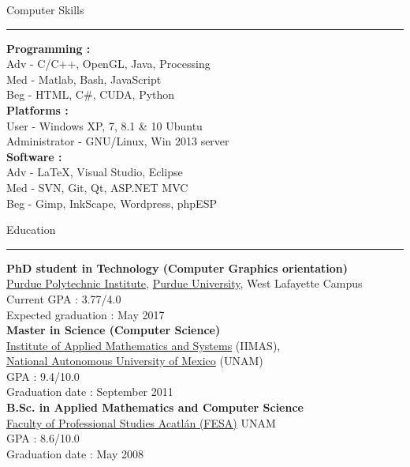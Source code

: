 \documentclass[letterpaper,10pt]{article}
\begin{document}
\begin{minipage}{0.40\textwidth}
\vspace*{-0.5cm}
 {\large{Computer Skills}} \\
 \textcolor{Dandelion}{\rule{0.5\textwidth}{0.05in}} 

\textbf{Programming :} \\
Adv - C/C++, OpenGL, Java, Processing \\
Med - Matlab, Bash, JavaScript \\
Beg - HTML, C\#, CUDA, Python\\

\textbf{Platforms :} \\
User - Windows XP, 7, 8.1 \& 10 Ubuntu \\
Administrator - GNU/Linux, Win 2013 server\\

\textbf{Software :} \\
Adv - \LaTeX, Visual Studio, Eclipse \\
Med - SVN, Git, Qt, ASP.NET MVC \\
Beg - Gimp, InkScape,  Wordpress, phpESP\\
\end{minipage}
%
\hspace{0.025\textwidth}
%
\begin{minipage}{0.70\textwidth} 
\vspace*{1.0cm}
{\centering \large{{Education}}} \\
\textcolor{Dandelion}{\rule{0.4\textwidth}{0.05in}}

\textbf{PhD student in Technology (Computer Graphics orientation)} \\
\href{http://polytechnic.purdue.edu/}{Purdue Polytechnic Institute}, \href{http://www.purdue.edu/}{Purdue University}, West Lafayette Campus \\
Current GPA : 3.77/4.0 \\
Expected graduation : May 2017 \\

\textbf{Master in Science (Computer Science)} \\
\href{http://www.iimas.unam.mx/}{Institute of Applied Mathematics and Systems} (IIMAS), \\ \href{http://www.unam.mx/}{National Autonomous University of Mexico} (UNAM) \\
GPA : 9.4/10.0 \\
Graduation date : September 2011 \\

\textbf{B.Sc. in Applied Mathematics and Computer Science} \\
\href{http://www.acatlan.unam.mx/}{Faculty of Professional Studies Acatl\'{a}n (FESA)} UNAM \\
GPA : 8.6/10.0 \\
Graduation date : May 2008\\
\end{minipage} 
\end{document}
